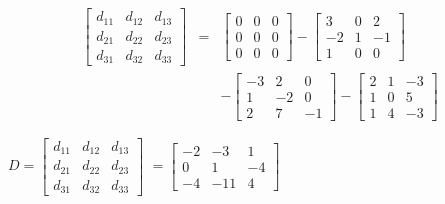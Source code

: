 \begin{enumerate}
\begin{description}
\begin{eqnarray*}
\left[\begin{array}{rrr}
                       d_{11}&d_{12}&d_{13}\\
                       d_{21}&d_{22}&d_{23}\\
                       d_{31}&d_{32}&d_{33}\end{array} \right]
&=&\left[ \begin{array}{rrr}
                       0&0&0\\
                       0&0&0\\
                       0&0&0\end{array} \right] -
\left[ \begin{array}{rrr}
                       3&0&2\\
                       -2&1&-1\\
                       1&0&0\end{array} \right] \\&&-
\left[ \begin{array}{rrr}
                        -3&2&0\\
                        1&-2&0\\
                        2&7&-1\end{array} \right] -
\left[ \begin{array}{rrr}
                        2&1&-3\\
                        1&0&5\\
                        1&4&-3\end{array} \right]
\end{eqnarray*}

$D=\left[\begin{array}{rrr}
                       d_{11}&d_{12}&d_{13}\\
                       d_{21}&d_{22}&d_{23}\\
                       d_{31}&d_{32}&d_{33}\end{array} \right]$
$=\left[ \begin{array}{rrr}
                       -2&-3&1\\
                       0&1&-4\\
                       -4&-11&4\end{array} \right]$
\end{description}
\vspace{1em}


\end{enumerate}
